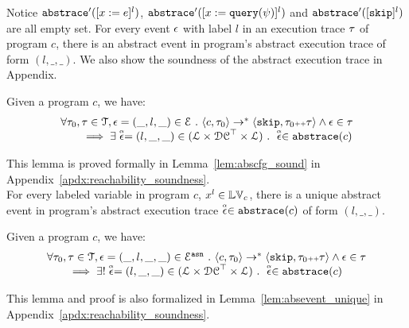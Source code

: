    Notice $\mathtt{abs}{\mathtt{trace}}'([x := e]^{l})$, $\mathtt{abs}{\mathtt{trace}}'([x := {\tt query}(\psi)]^{l})$ and $\mathtt{abs}{\mathtt{trace}}'([\mathtt{skip}]^{l})$ are all empty set. 
   For every event $\mathtt{\epsilon}$ with label $l$ in an execution trace $\mathtt{\tau}$ of program $c$, 
   there is an abstract event in program's abstract execution trace of form $(l, \_, \_)$.  
   We also show the soundness of the abstract execution trace in Appendix.
   \begin{lem}
     \label{lem:abscfg_sound}
   Given a program ${c}$, we have:
   \[
     \begin{array}{l}
       \forall \mathtt{\tau}_0, \mathtt{\tau} \in \mathcal{T} ,  \mathtt{\epsilon} = (\_, l, \_) \in \mathcal{E} ~.~
   \langle {c}, \mathtt{\tau}_0 \rangle \to^{*} \langle \mathtt{skip}, \mathtt{\tau}_0 {\scriptscriptstyle ++} \mathtt{\tau} \rangle 
   \land \mathtt{\epsilon} \in \mathtt{\tau} 
   \\
   \qquad \implies \exists \stackrel{\scriptscriptstyle{\alpha}}{\mathtt{\epsilon}{}} = (l, \_, \_) \in (\mathcal{L}\times \mathcal{DC}^{\top} \times \mathcal{L}) ~.~ 
   \stackrel{\scriptscriptstyle{\alpha}}{\mathtt{\epsilon}{}} \in \mathtt{abs}{\mathtt{trace}}(c)
   \end{array}
   \]
   \end{lem}
This lemma is proved formally in Lemma~\ref{lem:abscfg_sound} in Appendix~\ref{apdx:reachability_soundness}.
\\
For every labeled variable in program $c$, $x^l \in \mathbb{LV}_c$, there is a unique abstract event in program's abstract execution trace $\stackrel{\scriptscriptstyle{\alpha}}{\mathtt{\epsilon}{}} \in \mathtt{abs}{\mathtt{trace}}(c)$ of form $(l, \_, \_)$. 
\begin{lem}
  \label{lem:abscfg_unique}
Given a program ${c}$, we have:
%
\[
  \begin{array}{l}
    \forall \mathtt{\tau}_0, \mathtt{\tau} \in \mathcal{T} ,  \mathtt{\epsilon} = (\_, l, \_, \_) \in \mathcal{E}^{\mathtt{{asn}}} ~.~
\langle {c}, \mathtt{\tau}_0 \rangle \to^{*} \langle \mathtt{skip}, \mathtt{\tau}_0 {\scriptscriptstyle ++} \mathtt{\tau} \rangle 
\land \mathtt{\epsilon} \in \mathtt{\tau} 
\\
\qquad \implies \exists! \stackrel{\scriptscriptstyle{\alpha}}{\mathtt{\epsilon}{}} = (l, \_, \_) \in (\mathcal{L}\times \mathcal{DC}^{\top} \times \mathcal{L}) ~.~ 
\stackrel{\scriptscriptstyle{\alpha}}{\mathtt{\epsilon}{}} \in \mathtt{abs}{\mathtt{trace}}(c)
\end{array}
\]
\end{lem}
This lemma and proof is also 
formalized in Lemma~\ref{lem:absevent_unique} in Appendix~\ref{apdx:reachability_soundness}.

